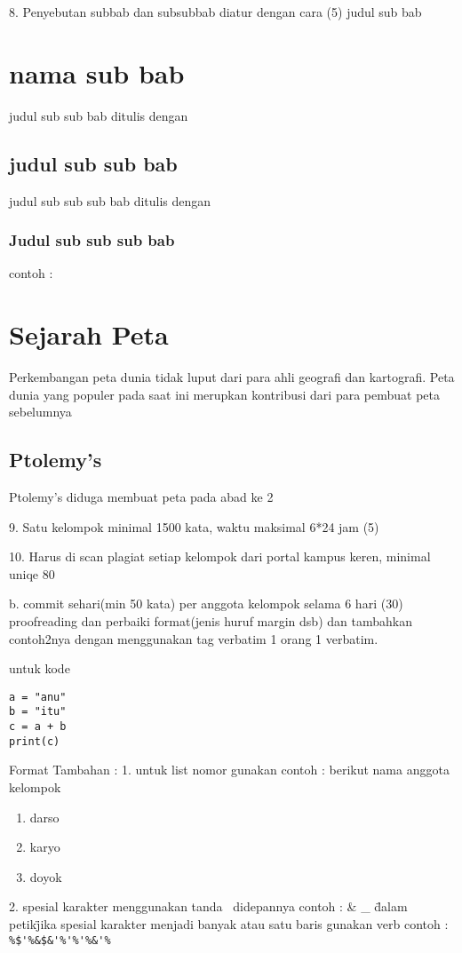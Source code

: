 	
		8. Penyebutan subbab dan subsubbab diatur dengan cara (5)
			judul sub bab \section{nama sub bab}
			judul sub sub bab ditulis dengan \subsection{judul sub sub bab}
			judul sub sub sub bab ditulis dengan \subsubsection{Judul sub sub sub bab}
			contoh :
			\section{Sejarah Peta}
			Perkembangan peta dunia tidak luput dari para ahli geografi dan kartografi. Peta dunia yang populer pada saat ini merupkan kontribusi dari para 
			pembuat peta sebelumnya

			\subsection{Ptolemy's}
			Ptolemy's diduga membuat peta pada abad ke 2
	
		9. Satu kelompok minimal 1500 kata, waktu maksimal 6*24 jam (5)

		10. Harus di scan plagiat setiap kelompok dari portal kampus keren, minimal uniqe 80%



b. commit sehari(min 50 kata) per anggota kelompok selama 6 hari (30) proofreading dan perbaiki format(jenis huruf margin dsb) dan tambahkan contoh2nya dengan menggunakan tag verbatim 1 orang 1 verbatim.


untuk kode
\begin{verbatim}
a = "anu"
b = "itu"
c = a + b
print(c) 
\end{verbatim}




Format Tambahan :
1. untuk list nomor gunakan
	contoh :
	berikut nama anggota kelompok
\begin{enumerate}
	\item darso
	\item karyo
	\item doyok
\end{enumerate}

2. spesial karakter menggunakan tanda \ didepannya
	contoh :
	\&
	\_
	\"dalam petik\"
	jika spesial karakter menjadi banyak atau satu baris gunakan verb
	contoh :
	\verb|%$'%&$&'%'%'%&'%|
	
